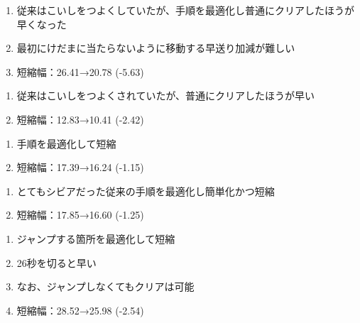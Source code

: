 \begin{enumerate}[label={\sarrow}]
\item 従来はこいしをつよくしていたが、手順を最適化し普通にクリアしたほうが早くなった
\item 最初にけだまに当たらないように移動する早送り加減が難しい
\item 短縮幅：26.41→20.78 (-5.63)
\end{enumerate}



\begin{enumerate}[label={\sarrow}]
\item 従来はこいしをつよくされていたが、普通にクリアしたほうが早い
\item 短縮幅：12.83→10.41 (-2.42)
\end{enumerate}



\begin{enumerate}[label={\sarrow}]
\item 手順を最適化して短縮
\item 短縮幅：17.39→16.24 (-1.15)
\end{enumerate}



\begin{enumerate}[label={\sarrow}]
\item とてもシビアだった従来の手順を最適化し簡単化かつ短縮
\item 短縮幅：17.85→16.60 (-1.25)
\end{enumerate}



\begin{enumerate}[label={\sarrow}]
\item ジャンプする箇所を最適化して短縮
\item 26秒を切ると早い
\item なお、ジャンプしなくてもクリアは可能
\item 短縮幅：28.52→25.98 (-2.54)
\end{enumerate}



